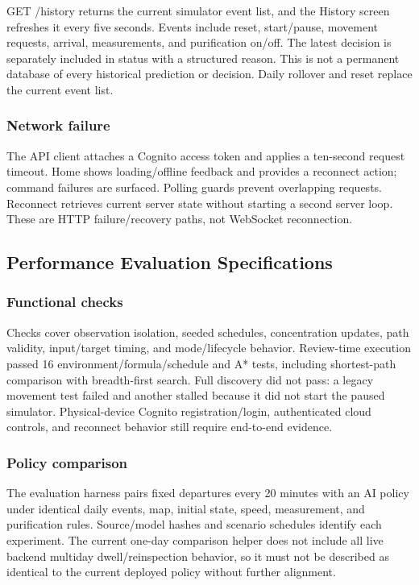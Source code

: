 \documentclass[conference]{IEEEtran}
\begin{document}
GET /history returns the current simulator event list, and the History screen refreshes it every five seconds. Events include reset, start/pause, movement requests, arrival, measurements, and purification on/off. The latest decision is separately included in status with a structured reason. This is not a permanent database of every historical prediction or decision. Daily rollover and reset replace the current event list.

\subsubsection{Network failure}

The API client attaches a Cognito access token and applies a ten-second request timeout. Home shows loading/offline feedback and provides a reconnect action; command failures are surfaced. Polling guards prevent overlapping requests. Reconnect retrieves current server state without starting a second server loop. These are HTTP failure/recovery paths, not WebSocket reconnection.

\subsection{Performance Evaluation Specifications}

\subsubsection{Functional checks}

Checks cover observation isolation, seeded schedules, concentration updates, path validity, input/target timing, and mode/lifecycle behavior. Review-time execution passed 16 environment/formula/schedule and A* tests, including shortest-path comparison with breadth-first search. Full discovery did not pass: a legacy movement test failed and another stalled because it did not start the paused simulator. Physical-device Cognito registration/login, authenticated cloud controls, and reconnect behavior still require end-to-end evidence.

\subsubsection{Policy comparison}

The evaluation harness pairs fixed departures every 20 minutes with an AI policy under identical daily events, map, initial state, speed, measurement, and purification rules. Source/model hashes and scenario schedules identify each experiment. The current one-day comparison helper does not include all live backend multiday dwell/reinspection behavior, so it must not be described as identical to the current deployed policy without further alignment.
\end{document}
